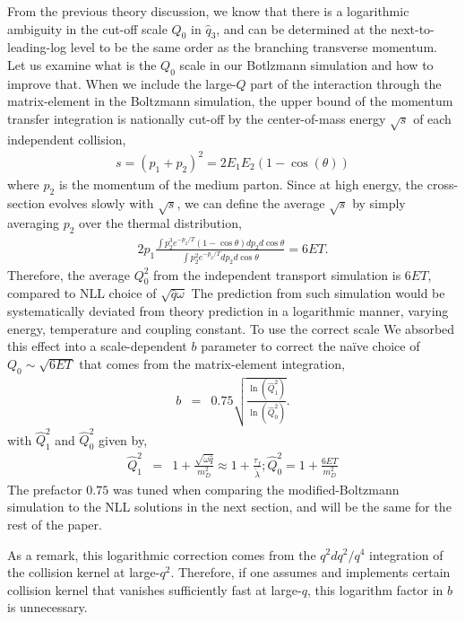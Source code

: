 From the previous theory discussion, we know that there is a logarithmic ambiguity in the cut-off scale $Q_0$ in $\hat{q}_3$, and can be determined at the next-to-leading-log level to be the same order as the branching transverse momentum.
Let us examine what is the $Q_0$ scale in our Botlzmann simulation and how to improve that.
When we include the large-$Q$ part of the interaction through the matrix-element in the Boltzmann simulation, the upper bound of the momentum transfer integration is nationally cut-off by the center-of-mass energy $\sqrt{s}$ of each independent collision,
\begin{eqnarray}
s = (p_1 + p_2)^2 = 2E_1 E_2 (1-\cos(\theta))
\end{eqnarray}
where $p_2$ is the momentum of the medium parton.
Since at high energy, the cross-section evolves slowly with $\sqrt{s}$, we can define the average $\sqrt{s}$ by simply averaging $p_2$ over the thermal distribution,
\begin{eqnarray}
2p_1\frac{ \int p_2^3 e^{-p_2/T}(1-\cos\theta) dp_2 d\cos \theta }{\int p_2^2 e^{-p_2/T} dp_2 d\cos \theta} =  6ET.
\end{eqnarray}
Therefore, the average $Q_0^2$ from the independent transport simulation is $6ET$, compared to NLL choice of $\sqrt{\hat{q} \omega}$
The prediction from such simulation would be systematically deviated from theory prediction in a logarithmic manner, varying energy, temperature and coupling constant.
To use the correct scale
We absorbed this effect into a scale-dependent $b$ parameter to correct the na\"ive choice of $Q_0 \sim \sqrt{6ET}$ that comes from the matrix-element integration,
\begin{eqnarray}
b &=& 0.75\sqrt{\frac{\ln(\hat{Q}_1^2 )}{\ln(\hat{Q}_0^2 )}}.
\label{eq:NLL-b}
\end{eqnarray}
with $\hat{Q}_1^2$ and $\hat{Q}_0^2$ given by,
\begin{eqnarray}
\hat{Q}_1^2 &=& 1 + \frac{\sqrt{\omega\hat{q}}}{m_D^2} \approx 1 + \frac{\tau_f}{\tilde{\lambda}}; 
\hat{Q}_0^2 = 1 + \frac{6ET}{m_D^2}
\end{eqnarray}
The prefactor $0.75$ was tuned when comparing the modified-Boltzmann simulation to the NLL solutions in the next section, and will be the same for the rest of the paper.

As a remark, this logarithmic correction comes from the $q^2 dq^2 /q^4$ integration of the collision kernel at large-$q^2$.
Therefore, if one assumes and implements certain collision kernel that vanishes sufficiently fast at large-$q$, this logarithm factor in $b$ is unnecessary. 


